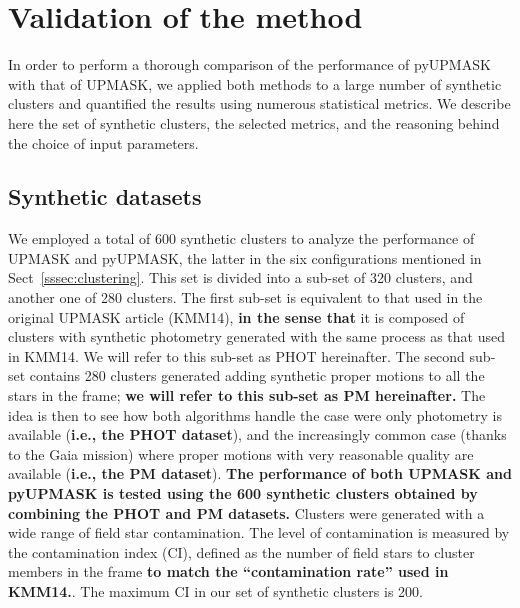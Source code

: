 \documentclass{aa}
\begin{document}
\section{Validation of the method}
 \label{sec:validation}

 In order to perform a thorough comparison of the performance of pyUPMASK
 with that of UPMASK, we applied both methods to a large number of synthetic
 clusters and quantified the results using numerous statistical metrics.
 We describe here the set of synthetic clusters, the selected metrics, and the
 reasoning behind the choice of input parameters.



\subsection{Synthetic datasets}
 \label{ssec:synthetic}

 We employed a total of 600 synthetic clusters to analyze the performance of
 UPMASK and pyUPMASK, the latter in the six configurations mentioned in
 Sect~\ref{sssec:clustering}. This set is divided into a sub-set of 320
 clusters, and another one of 280 clusters. The first sub-set is equivalent to
 that used in the original UPMASK article (KMM14), \textbf{in the sense that}
 it is composed of clusters with synthetic photometry generated with the same
 process as that used in KMM14. We will refer to this sub-set as PHOT
 hereinafter.
 The second sub-set contains 280 clusters generated adding synthetic proper
 motions to all the stars in the frame; \textbf{we will refer to this sub-set
 as PM hereinafter.}
 The idea is then to see how both algorithms handle the case were only
 photometry is available (\textbf{i.e., the PHOT dataset}), and the
 increasingly common case (thanks to the Gaia mission) where proper motions
 with very reasonable quality are available (\textbf{i.e., the PM dataset}).
 \textbf{The performance of both UPMASK and pyUPMASK is tested using the 600
 synthetic clusters obtained by combining the PHOT and PM datasets.}
 Clusters were generated with a wide range of field star contamination.
 The level of contamination is measured by the contamination index (CI),
 defined as the number of field stars to cluster members in the frame 
 \textbf{to match the ``contamination rate'' used in KMM14.}. The
 maximum CI in our set of synthetic clusters is 200.
\end{document}
